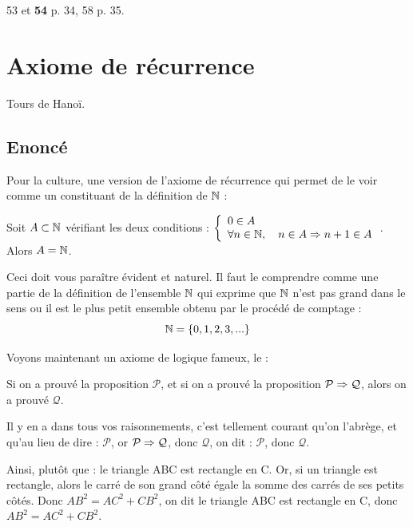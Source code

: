 \documentclass[a4paper,11pt,DIV20,BCOR0mm]{scrartcl}
\begin{document}
\begin{exercice}
 53 et \textbf{54} p. 34, 58 p. 35.
\end{exercice}

\pagebreak

\section{Axiome de récurrence}
\begin{exemple}[introductif]
 Tours de Hanoï.
\end{exemple}


\label{axiome}
\subsection{Enoncé}
Pour la culture, une version de l'axiome de récurrence qui permet de le voir comme un constituant de la définition de $\mathbb{N}$ :
\begin{axiome}
	Soit $A\subset\mathbb{N}$ vérifiant les deux conditions : $\left\{\begin{array}{ll}0\in A\\\forall n\in\mathbb{N},\quad n\in A\Rightarrow n+1\in A\end{array}\right.$. Alors $A=\mathbb{N}$.
\end{axiome}
Ceci doit vous paraître évident et naturel. Il faut le comprendre comme une partie de la définition de 
l'ensemble $\mathbb{N}$ qui exprime
que $\mathbb{N}$ \og n'est pas grand\fg{} dans le sens ou il est le plus petit ensemble obtenu par le procédé de comptage :
\[
	\mathbb{N}=\{0, 1, 2, 3, ...\}
\]

Voyons maintenant un axiome de logique fameux, le  :
\begin{axiome}
 Si on a prouvé la proposition $\mathcal{P}$, et si on a prouvé la proposition $\mathcal{P}\Rightarrow\mathcal{Q}$,
alors on a prouvé $\mathcal{Q}$.
\end{axiome}

\begin{exemple}
 Il y en a dans tous vos raisonnements, c'est tellement courant qu'on l'abrège, et qu'au lieu de dire :
\og $\mathcal{P}$, or $\mathcal{P}\Rightarrow\mathcal{Q}$, donc $\mathcal{Q}$\fg, on dit :
$\mathcal{P}$, donc $\mathcal{Q}$.

Ainsi, plutôt que : \og le triangle ABC est rectangle en C. Or, si un triangle est rectangle, 
alors le carré de son grand côté égale la somme des carrés de ses petits côtés. Donc $AB^2=AC^2+CB^2$\fg,
on dit \og le triangle ABC est rectangle en C, donc $AB^2=AC^2+CB^2$\fg.
\end{exemple}
\end{document}
